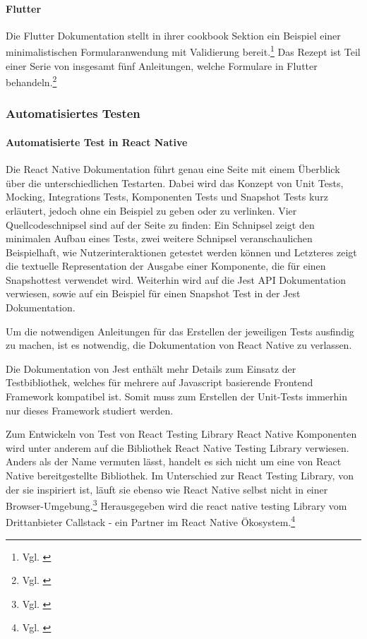 \paragraph{Flutter}
Die Flutter Dokumentation stellt in ihrer cookbook Sektion ein Beispiel einer minimalistischen Formularanwendung mit Validierung bereit.\footnote{Vgl. \cite{BuildAFormWithValidation}} Das Rezept ist Teil einer Serie von insgesamt fünf Anleitungen,  welche Formulare in Flutter behandeln.\footnote{Vgl. \cite{FormsFlutter}}

\subsubsection{Automatisiertes Testen}

\paragraph{Automatisierte Test in React Native} Die React Native Dokumentation führt genau eine Seite mit einem Überblick über die unterschiedlichen Testarten. Dabei wird das Konzept von Unit Tests, Mocking, Integrations Tests, Komponenten Tests und Snapshot Tests kurz erläutert, jedoch ohne ein Beispiel zu geben oder zu verlinken. Vier Quellcodeschnipsel sind auf der Seite zu finden: Ein Schnipsel zeigt den minimalen Aufbau eines Tests, zwei weitere Schnipsel veranschaulichen Beispielhaft, wie Nutzerinteraktionen getestet werden können und Letzteres zeigt die textuelle Representation der Ausgabe einer Komponente, die für einen Snapshottest verwendet wird. Weiterhin wird auf die Jest API Dokumentation verwiesen, sowie auf ein Beispiel für einen Snapshot Test in der Jest Dokumentation.

Um die notwendigen Anleitungen für das Erstellen der jeweiligen Tests ausfindig zu machen, ist es notwendig, die Dokumentation von React Native zu verlassen.

Die Dokumentation von Jest enthält mehr Details zum Einsatz der Testbibliothek, welches für mehrere auf Javascript basierende Frontend Framework kompatibel ist. Somit muss zum Erstellen der Unit-Tests immerhin nur dieses Framework studiert werden.

Zum Entwickeln von Test von React Testing Library React Native Komponenten wird unter anderem auf die Bibliothek React Native Testing Library verwiesen. Anders als der Name vermuten lässt, handelt es sich nicht um eine von React Native bereitgestellte Bibliothek. Im Unterschied zur React Testing Library, von der sie inspiriert ist, läuft sie  ebenso  wie React Native selbst nicht in einer Browser-Umgebung.\footnote{Vgl. \cite{NativeTestingLibraryIntroduction}} Herausgegeben wird die react native testing Library vom Drittanbieter Callstack - ein Partner im React Native Ökosystem.\footnote{Vgl. \cite{TheReactNativeEcosystem}}

